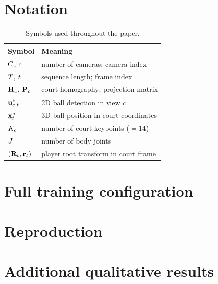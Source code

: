 \AppendixHeader

\section{Notation}
\label{sec:appendix_notation}


\begin{table}[h]
  \centering
  \begin{tabular}{ll}
    \toprule
    Symbol & Meaning \\
    \midrule
    $C$, $c$ & number of cameras; camera index \\
    $T$, $t$ & sequence length; frame index \\
    $\mathbf{H}_{c}$, $\mathbf{P}_{c}$ & court homography; projection matrix \\
    $\mathbf{u}^{\mathrm{b}}_{c,t}$ & 2D ball detection in view $c$ \\
    $\mathbf{x}^{\mathrm{b}}_{t}$ & 3D ball position in court coordinates \\
    $K_{\mathrm{c}}$ & number of court keypoints ($=14$) \\
    $J$ & number of body joints \\
    $(\mathbf{R}_{t}, \mathbf{r}_{t})$ & player root transform in court frame \\
    \bottomrule
  \end{tabular}
  \caption{Symbols used throughout the paper.}
  \label{tab:notation}
\end{table}

\section{Full training configuration}
\label{sec:appendix_config}

\section{Reproduction}
\label{sec:appendix_repro}

\section{Additional qualitative results}
\label{sec:appendix_qualitative}
